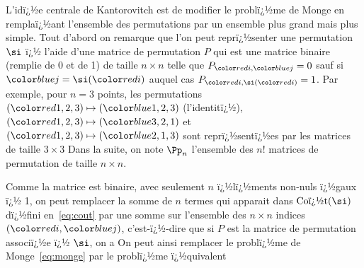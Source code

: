 L'idï¿½e centrale de Kantorovitch est de modifier le problï¿½me de Monge en remplaï¿½ant l'ensemble des permutations par un ensemble plus grand mais plus simple. Tout d'abord on remarque que l'on peut reprï¿½senter une permutation $\si$ ï¿½ l'aide d'une matrice de permutation $P$ qui est une matrice binaire (remplie de 0 et de 1) de taille $n \times n$ telle que $P_{\iC,\jC} = 0$ sauf si $\jC=\si(\iC)$ auquel cas $P_{\iC,\si(\iC)} = 1$. Par exemple, pour $n=3$ points, les permutations 
$(\Red{1,2,3}) \mapsto (\Blu{1,2,3})$ (l'identitï¿½), 
$(\Red{1,2,3}) \mapsto (\Blu{3,2,1})$ et
$(\Red{1,2,3}) \mapsto (\Blu{2,1,3})$ sont reprï¿½sentï¿½es par les matrices de taille $3 \times 3$
Dans la suite, on note $\Pp_n$ l'ensemble des $n!$ matrices de permutation de taille $n \times n$.

Comme la matrice est binaire, avec seulement $n$ ï¿½lï¿½ments non-nuls ï¿½gaux ï¿½ 1, on peut remplacer la somme de $n$ termes qui apparait dans $\text{Coï¿½t}(\si)$ dï¿½fini en~\eqref{eq:cout} par une somme sur l'ensemble des $n \times n$ indices $(\iC,\jC)$, c'est-ï¿½-dire que si $P$ est la matrice de permutation associï¿½e ï¿½ $\si$, on a 
On peut ainsi remplacer le problï¿½me de Monge~\eqref{eq:monge} par le problï¿½me ï¿½quivalent 

